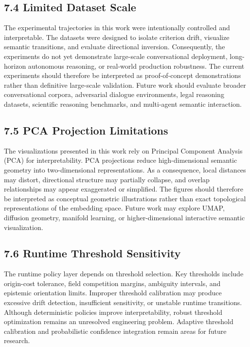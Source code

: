 \documentclass[11pt]{article}
\begin{document}
\subsection{7.4 Limited Dataset Scale}

The experimental trajectories in this work were intentionally controlled and interpretable. The datasets were designed to isolate criterion drift, visualize semantic transitions, and evaluate directional inversion. Consequently, the experiments do not yet demonstrate large-scale conversational deployment, long-horizon autonomous reasoning, or real-world production robustness. The current experiments should therefore be interpreted as proof-of-concept demonstrations rather than definitive large-scale validation. Future work should evaluate broader conversational corpora, adversarial dialogue environments, legal reasoning datasets, scientific reasoning benchmarks, and multi-agent semantic interaction.

\subsection{7.5 PCA Projection Limitations}

The visualizations presented in this work rely on Principal Component Analysis (PCA) for interpretability. PCA projections reduce high-dimensional semantic geometry into two-dimensional representations. As a consequence, local distances may distort, directional structure may partially collapse, and overlap relationships may appear exaggerated or simplified. The figures should therefore be interpreted as conceptual geometric illustrations rather than exact topological representations of the embedding space. Future work may explore UMAP, diffusion geometry, manifold learning, or higher-dimensional interactive semantic visualization.

\subsection{7.6 Runtime Threshold Sensitivity}

The runtime policy layer depends on threshold selection. Key thresholds include origin-cost tolerance, field competition margins, ambiguity intervals, and epistemic orientation limits. Improper threshold calibration may produce excessive drift detection, insufficient sensitivity, or unstable runtime transitions. Although deterministic policies improve interpretability, robust threshold optimization remains an unresolved engineering problem. Adaptive threshold calibration and probabilistic confidence integration remain areas for future research.
\end{document}
